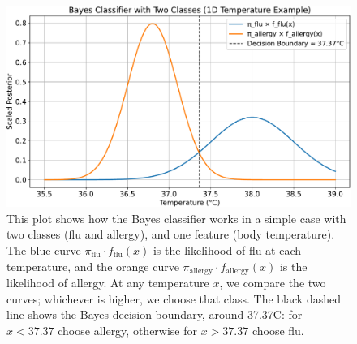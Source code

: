 \begin{figure}[!htp]
    \centering
    \includegraphics[width=\textwidth]{img/bayes-classifier/bayes-classifier-with-two-classes.pdf}
    \caption{This plot shows how the Bayes classifier works in a simple case with two classes (flu and allergy), and one feature (body temperature). The blue curve $\pi_{\text{flu}} \cdot f_{\text{flu}}\left(x\right)$ is the likelihood of flu at each temperature, and the orange curve $\pi_{\text{allergy}} \cdot f_{\text{allergy}}\left(x\right)$ is the likelihood of allergy. At any temperature $x$, we compare the two curves; whichever is higher, we choose that class. The black dashed line shows the Bayes decision boundary, around 37.37\textdegree C: for $x < 37.37$ choose allergy, otherwise for $x > 37.37$ choose flu.}
\end{figure}